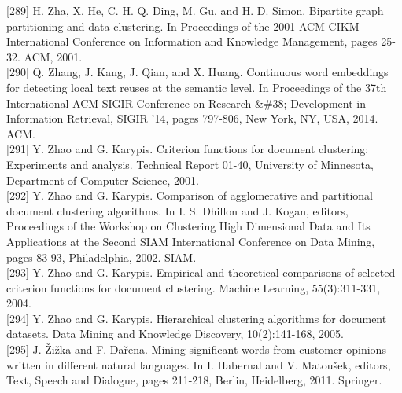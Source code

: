 \documentclass[10pt]{book}
\begin{document}
[289] H. Zha, X. He, C. H. Q. Ding, M. Gu, and H. D. Simon. Bipartite graph partitioning and data clustering. In Proceedings of the 2001 ACM CIKM International Conference on Information and Knowledge Management, pages 25-32. ACM, 2001.\\[0pt]
[290] Q. Zhang, J. Kang, J. Qian, and X. Huang. Continuous word embeddings for detecting local text reuses at the semantic level. In Proceedings of the 37th International ACM SIGIR Conference on Research \&\#38; Development in Information Retrieval, SIGIR '14, pages 797-806, New York, NY, USA, 2014. ACM.\\[0pt]
[291] Y. Zhao and G. Karypis. Criterion functions for document clustering: Experiments and analysis. Technical Report 01-40, University of Minnesota, Department of Computer Science, 2001.\\[0pt]
[292] Y. Zhao and G. Karypis. Comparison of agglomerative and partitional document clustering algorithms. In I. S. Dhillon and J. Kogan, editors, Proceedings of the Workshop on Clustering High Dimensional Data and Its Applications at the Second SIAM International Conference on Data Mining, pages 83-93, Philadelphia, 2002. SIAM.\\[0pt]
[293] Y. Zhao and G. Karypis. Empirical and theoretical comparisons of selected criterion functions for document clustering. Machine Learning, 55(3):311-331, 2004.\\[0pt]
[294] Y. Zhao and G. Karypis. Hierarchical clustering algorithms for document datasets. Data Mining and Knowledge Discovery, 10(2):141-168, 2005.\\[0pt]
[295] J. Žižka and F. Dařena. Mining significant words from customer opinions written in different natural languages. In I. Habernal and V. Matoušek, editors, Text, Speech and Dialogue, pages 211-218, Berlin, Heidelberg, 2011. Springer.
\end{document}
